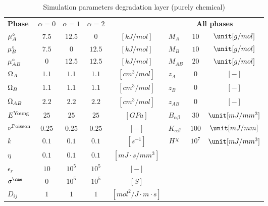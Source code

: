 \begin{table}[h!]
  \caption{Simulation parameters degradation layer (purely chemical)}
  \centering
  \begin{tabular}{ l c c c c | l c c  }
    \hline
    \rowcolor{gray2}
                        \textbf{Phase}& $\alpha=0$  & $\alpha=1$ & $\alpha=2$ & &\multicolumn{3}{c}{\textbf{All phases}} \\
    \rowcolor{gray1}
    $\mu^{\circ}_A$         & $7.5$  & $12.5$ & $0$    & $\unit{[kJ/mol]}$      & $M_A$    & $10$   & $\unit[g/mol]$ \\ 
    $\mu^{\circ}_B$         & $7.5$  & $0$    & $12.5$ & $\unit{[kJ/mol]}$      & $M_B$    & $10$   & $\unit[g/mol]$ \\
    \rowcolor{gray1}
    $\mu^{\circ}_{AB}$      & $0$    & $12.5$ & $12.5$ & $\unit{[kJ/mol]}$      & $M_{AB}$ & $20$   & $\unit[g/mol]$ \\
    $\Omega_A$      & $1.1$  & $1.1$  & $1.1$  & $\unit{[cm^3/mol]}$    & $z_{A}$  & $0$    & $\unit{[-]}$  \\
    \rowcolor{gray1}
    $\Omega_B$      & $1.1$  & $1.1$  & $1.1$  & $\unit{[cm^3/mol]}$    & $z_{B}$  & $0$    & $\unit{[-]}$  \\
    $\Omega_{AB}$   & $2.2$  & $2.2$  & $2.2$  & $\unit{[cm^3/mol]}$    & $z_{AB}$ & $0$    & $\unit{[-]}$  \\ 
    \rowcolor{gray1}
    $E^{\rm Young}$     & $25$   & $25$   & $25$   & $\unit{[GPa]}$         & $B_{\alpha\beta}$ & $30$    & $\unit[mJ/mm^3]$ \\
    $\nu^{\rm Poisson}$ & $0.25$ & $0.25$ & $0.25$ & $ [-] $                & $K_{\alpha\beta}$ & $100$   & $\unit[mJ/mm]$ \\
    \rowcolor{gray1}
    $k$                 & $0.1$  & $0.1$  & $0.1$  & $\unit{[s^{-1}]}$      & $H^{\chi} $ & $10^7$ & $\unit[mJ/mm^3]$ \\
    $\eta$              & $0.1$  & $0.1$  & $0.1$  & $\unit{[mJ \cdot s/mm^3]}$ & & & \\
    \rowcolor{gray1}
    $\epsilon_r$        & $10 $  & $10^5$ & $10^5$ & $\unit{[-]}$           & & & \\
    $\sigmae$           & $0$    & $10^5$ & $10^5$ & $\unit{[S]}$ & & & \\
    \rowcolor{gray1}
    $D_{ij}$           & $1$    & $1$    & $1$    & $\unit{[mol^2/J \cdot m \cdot s]}$ & & & \\
    \hline
  \end{tabular} 
  \label{tab:BarChem}
\end{table}

